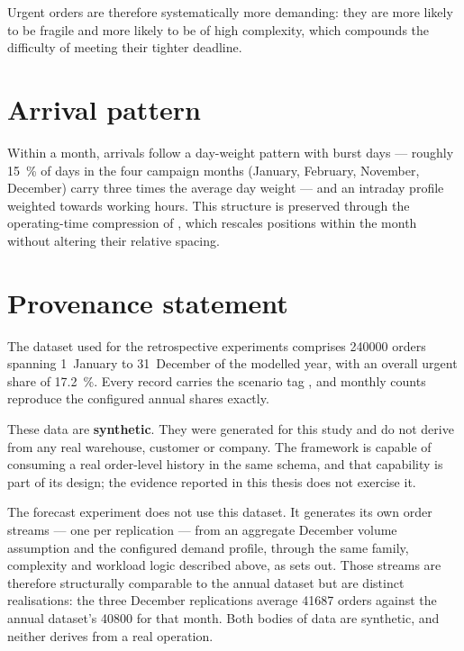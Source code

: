 Urgent orders are therefore systematically more demanding: they are more likely to be fragile
and more likely to be of high complexity, which compounds the difficulty of meeting their
tighter deadline.

\section{Arrival pattern}

Within a month, arrivals follow a day-weight pattern with burst days --- roughly
\SI{15}{\percent} of days in the four campaign months (January, February, November, December)
carry three times the average day weight --- and an intraday profile weighted towards working
hours. This structure is preserved through the operating-time compression of
, which rescales positions within the month without altering their relative
spacing.

\section{Provenance statement}
\label{sec:app-provenance}

The dataset used for the retrospective experiments comprises \num{240000} orders spanning
1~January to 31~December of the modelled year, with an overall urgent share of
\SI{17.2}{\percent}. Every record carries the scenario tag , and monthly
counts reproduce the configured annual shares exactly.

These data are \textbf{synthetic}. They were generated for this study and do not derive from any
real warehouse, customer or company. The framework is capable of consuming a real order-level
history in the same schema, and that capability is part of its design; the evidence reported in
this thesis does not exercise it.

The forecast experiment does not use this dataset. It generates its own order streams --- one
per replication --- from an aggregate December volume assumption and the configured demand
profile, through the same family, complexity and workload logic described above, as
 sets out. Those streams are therefore structurally comparable to
the annual dataset but are distinct realisations: the three December replications average
\num{41687} orders against the annual dataset's \num{40800} for that month. Both bodies of data
are synthetic, and neither derives from a real operation.
